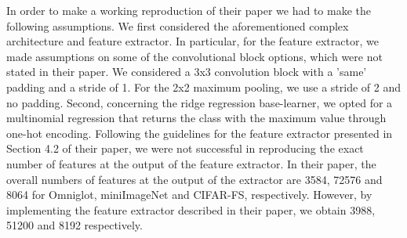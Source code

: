 In order to make a working reproduction of their paper we had to make the following assumptions. We first considered the aforementioned complex architecture and feature extractor. In particular, for the feature extractor, we made assumptions on some of the convolutional block options, which were not stated in their paper. We considered a 3x3 convolution block with a 'same' padding and a stride of 1. For the 2x2 maximum pooling, we use a stride of 2 and no padding. Second, concerning the ridge regression base-learner, we opted for a multinomial regression that returns the class with the maximum value through one-hot encoding.
Following the guidelines for the feature extractor presented in Section 4.2 of their paper, we were not successful in reproducing the exact number of features at the output of the feature extractor. In their paper, the overall numbers of features at the output of the extractor are 3584, 72576 and 8064 for Omniglot, miniImageNet and \textsc{CIFAR-FS}, respectively. However, by implementing the feature extractor described in their paper, we obtain 3988, 51200 and 8192 respectively.\\

